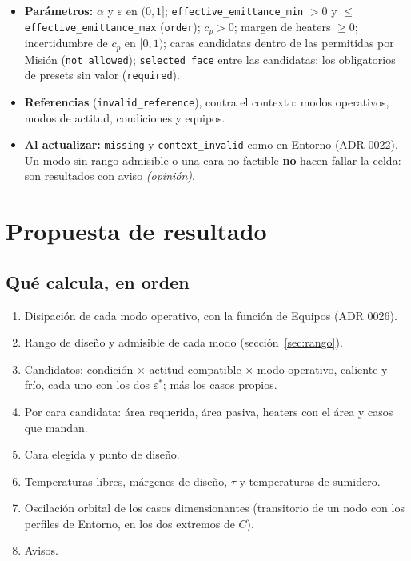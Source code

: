 \documentclass[11pt,a4paper]{article}
\newcommand{\code}[1]{\texttt{#1}}
\newcommand{\op}[1]{\textcolor{opinion}{\textit{(#1)}}}
\begin{document}
\begin{itemize}
  \item \textbf{Parámetros:} $\alpha$ y $\varepsilon$ en $(0, 1]$; \code{effective\_emittance\_min} $> 0$ y $\le$ \code{effective\_emittance\_max} (\code{order}); $c_p > 0$; margen de heaters $\ge 0$; incertidumbre de $c_p$ en $[0, 1)$; caras candidatas dentro de las permitidas por Misión (\code{not\_allowed}); \code{selected\_face} entre las candidatas; los obligatorios de presets sin valor (\code{required}).
  \item \textbf{Referencias} (\code{invalid\_reference}), contra el contexto: modos operativos, modos de actitud, condiciones y equipos.
  \item \textbf{Al actualizar:} \code{missing} y \code{context\_invalid} como en Entorno (ADR 0022). Un modo sin rango admisible o una cara no factible \textbf{no} hacen fallar la celda: son resultados con aviso \op{opinión}.
\end{itemize}

\section{Propuesta de resultado}\label{sec:resultado}

\subsection{Qué calcula, en orden}

\begin{enumerate}
  \item Disipación de cada modo operativo, con la función de Equipos (ADR 0026).
  \item Rango de diseño y admisible de cada modo (sección~\ref{sec:rango}).
  \item Candidatos: condición $\times$ actitud compatible $\times$ modo operativo, caliente y frío, cada uno con los dos $\varepsilon^*$; más los casos propios.
  \item Por cara candidata: área requerida, área pasiva, heaters con el área y casos que mandan.
  \item Cara elegida y punto de diseño.
  \item Temperaturas libres, márgenes de diseño, $\tau$ y temperaturas de sumidero.
  \item Oscilación orbital de los casos dimensionantes (transitorio de un nodo con los perfiles de Entorno, en los dos extremos de $C$).
  \item Avisos.
\end{enumerate}
\end{document}
